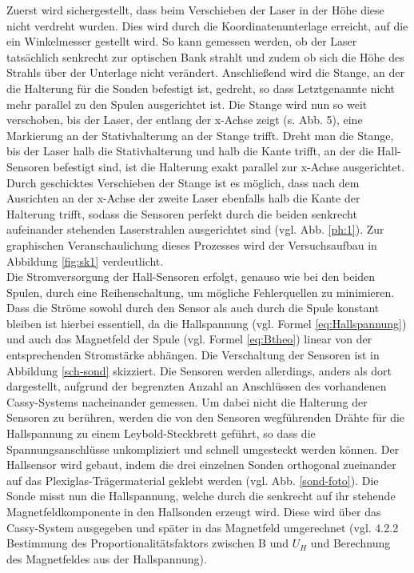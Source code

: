 \documentclass[12pt,a4paper]{article}
\begin{document}
Zuerst wird sichergestellt, dass beim Verschieben der Laser in der Höhe diese nicht verdreht wurden. Dies wird durch die Koordinatenunterlage erreicht, auf die ein Winkelmesser gestellt wird. So kann gemessen werden, ob der Laser tatsächlich senkrecht zur optischen Bank strahlt und zudem ob sich die Höhe des Strahls über der Unterlage nicht verändert. Anschließend wird die Stange, an der die Halterung für die Sonden befestigt ist, gedreht, so dass Letztgenannte nicht mehr parallel zu den Spulen ausgerichtet ist. Die Stange wird nun so weit verschoben, bis der Laser, der entlang der x-Achse zeigt (s. Abb. 5), eine Markierung an der Stativhalterung an der Stange trifft. Dreht man die Stange, bis der Laser halb die Stativhalterung und halb die Kante trifft, an der die Hall-Sensoren befestigt sind, ist die Halterung exakt parallel zur x-Achse ausgerichtet. Durch geschicktes Verschieben der Stange ist es möglich, dass nach dem Ausrichten an der x-Achse der zweite Laser ebenfalls halb die Kante der Halterung trifft, sodass die Sensoren perfekt durch die beiden senkrecht aufeinander stehenden Laserstrahlen ausgerichtet sind (vgl. Abb. \ref{ph:1}). Zur graphischen Veranschaulichung dieses Prozesses wird der Versuchsaufbau in Abbildung \ref{fig:sk1} verdeutlicht.\\

Die Stromversorgung der Hall-Sensoren erfolgt, genauso wie bei den beiden Spulen, durch eine Reihenschaltung, um mögliche Fehlerquellen zu minimieren. Dass die Ströme sowohl durch den Sensor als auch durch die Spule konstant bleiben ist hierbei essentiell, da die Hallspannung (vgl. Formel \ref{eq:Hallspannung}) und auch das Magnetfeld der Spule (vgl. Formel \ref{eq:Btheo}) linear von der entsprechenden Stromstärke abhängen. Die Verschaltung der Sensoren ist in Abbildung \ref{sch-sond} skizziert. Die Sensoren werden allerdings, anders als dort dargestellt, aufgrund der begrenzten Anzahl an Anschlüssen des vorhandenen Cassy-Systems nacheinander gemessen. Um dabei nicht die Halterung der Sensoren zu berühren, werden die von den Sensoren wegführenden Drähte für die Hallspannung zu einem Leybold-Steckbrett geführt, so dass die Spannungsanschlüsse unkompliziert und schnell umgesteckt werden können. Der Hallsensor wird gebaut, indem die drei einzelnen Sonden orthogonal zueinander auf das Plexiglas-Trägermaterial geklebt werden (vgl. Abb. \ref{sond-foto}).
Die Sonde misst nun die Hallspannung, welche durch die senkrecht auf ihr stehende Magnetfeldkomponente in den Hallsonden erzeugt wird. Diese wird über das Cassy-System ausgegeben und später in das Magnetfeld umgerechnet (vgl. 4.2.2 Bestimmung des Proportionalitätsfaktors zwischen B und $U_H$ und Berechnung des Magnetfeldes aus der Hallspannung).
\end{document}
